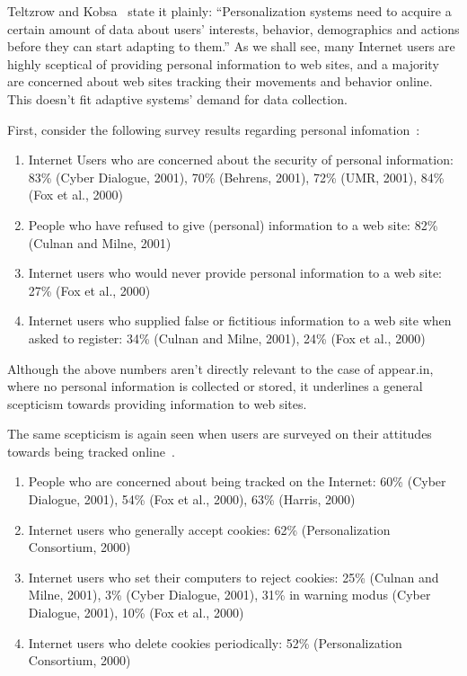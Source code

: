 Teltzrow and Kobsa~\cite{Teltzrow2004} state it plainly: ``Personalization systems need to acquire a certain amount of data about users' interests, behavior, demographics and actions before they can start adapting to them.'' As we shall see, many Internet users are highly sceptical of providing personal information to web sites, and a majority are concerned about web sites tracking their movements and behavior online. This doesn't fit adaptive systems' demand for data collection.

First, consider the following survey results regarding personal infomation~\cite{Teltzrow2004}:

\begin{enumerate}
  \item Internet Users who are concerned about the security of personal information: 83\% (Cyber Dialogue, 2001), 70\% (Behrens, 2001), 72\% (UMR, 2001), 84\% (Fox et al., 2000)
  \item People who have refused to give (personal) information to a web site: 82\% (Culnan and Milne, 2001)
  \item Internet users who would never provide personal information to a web site: 27\% (Fox et al., 2000)
  \item Internet users who supplied false or fictitious information to a web site when asked to register: 34\% (Culnan and Milne, 2001), 24\% (Fox et al., 2000)
\end{enumerate}


Although the above numbers aren't directly relevant to the case of appear.in, where no personal information is collected or stored, it underlines a general scepticism towards providing information to web sites.

The same scepticism is again seen when users are surveyed on their attitudes towards being tracked online~\cite{Teltzrow2004}.

\begin{enumerate}
  \item People who are concerned about being tracked on the Internet: 60\% (Cyber Dialogue, 2001), 54\% (Fox et al., 2000), 63\% (Harris, 2000)
  \item Internet users who generally accept cookies: 62\% (Personalization Consortium, 2000)
  \item Internet users who set their computers to reject cookies: 25\% (Culnan and Milne, 2001), 3\% (Cyber Dialogue, 2001), 31\% in warning modus (Cyber Dialogue, 2001), 10\% (Fox et al., 2000)
  \item Internet users who delete cookies periodically: 52\% (Personalization Consortium, 2000)
\end{enumerate}

